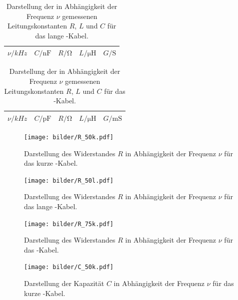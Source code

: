 \begin{table}[htpb]
  \centering
  \begin{tabular}{ccccc}
    \midrule
    \midrule
    $\nu / \si{kHz}$        & $C / \si{\nano\farad}$     & $R / \si{\ohm}$ &
    $L / \si{\micro\henry}$ & $G / \si{\siemens}$ \\
    \midrule
    
    \midrule
    \midrule
  \end{tabular}
  \caption{Darstellung der in Abhängigkeit der Frequenz $\nu$ gemessenen
      Leitungskonstanten $R$, $L$ und $C$ für das lange \CU-Kabel.}
\label{tab:Leitungskonstanten_50l}
\end{table}

\begin{table}[htpb]
  \centering
  \begin{tabular}{ccccc}
    \midrule
    \midrule
    $\nu / \si{kHz}$        & $C / \si{\pico\farad}$     & $R / \si{\ohm}$ &
    $L / \si{\micro\henry}$ & $G / \si{\milli\siemens}$ \\
    \midrule
    
    \midrule
    \midrule
  \end{tabular}
  \caption{Darstellung der in Abhängigkeit der Frequenz $\nu$ gemessenen
      Leitungskonstanten $R$, $L$ und $C$ für das \BU-Kabel.}
\label{tab:Leitungskonstanten_75k}
\end{table}


\begin{figure}[t]
	\centering
	\texttt{[image: bilder/R\_50k.pdf]}
	\caption{Darstellung des Widerstandes $R$ in Abhängigkeit der Frequenz $\nu$
	für das kurze \CU-Kabel.}
	\label{fig:R_50k}
	\texttt{[image: bilder/R\_50l.pdf]}
	\caption{Darstellung des Widerstandes $R$ in Abhängigkeit der Frequenz $\nu$
	für das lange \CU-Kabel.}
	\label{fig:R_50l}
\end{figure}

\begin{figure}[h!]
	\centering
	\texttt{[image: bilder/R\_75k.pdf]}
	\caption{Darstellung des Widerstandes $R$ in Abhängigkeit der Frequenz $\nu$
	für das \BU-Kabel.}
	\label{fig:R_75k}
	\texttt{[image: bilder/C\_50k.pdf]}
	\caption{Darstellung der Kapazität $C$ in Abhängigkeit der Frequenz $\nu$
	für das kurze \CU-Kabel.}
	\label{fig:C_50k}
\end{figure}

